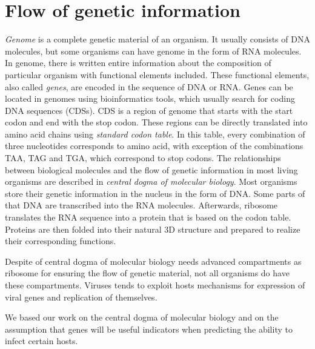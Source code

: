 \section{Flow of genetic information}
\emph{Genome} is a complete genetic material of an organism.
It usually consists of DNA molecules, but some organisms can have genome in the form of RNA molecules.
In genome, there is written entire information about the composition of particular organism with functional elements included.
These functional elements, also called \emph{genes}, are encoded in the sequence of DNA or RNA.
Genes can be located in genomes using bioinformatics tools, which usually search for coding DNA sequences (CDSs).
CDS is a region of genome that starts with the start codon and end with the stop codon.
These regions can be directly translated into amino acid chains using \emph{standard codon table}.
In this table, every combination of three nucleotides corresponds to amino acid, with exception of the combinations TAA, TAG and TGA, which correspond to stop codons.
The relationships between biological molecules and the flow of genetic information in most living organisms are described in \emph{central dogma of molecular biology}.
Most organisms store their genetic information in the nucleus in the form of DNA.
Some parts of that DNA are transcribed into the RNA molecules.
Afterwards, ribosome translates the RNA sequence into a protein that is based on the codon table.
Proteins are then folded into their natural 3D structure and prepared to realize their corresponding functions.

Despite of central dogma of molecular biology needs advanced compartments as ribosome for ensuring the flow of genetic material, not all organisms do have these compartments.
Viruses tends to exploit hosts mechanisms for expression of viral genes and replication of themselves.

We based our work on the central dogma of molecular biology and on the assumption that genes will be useful indicators when predicting the ability to infect certain hosts.

